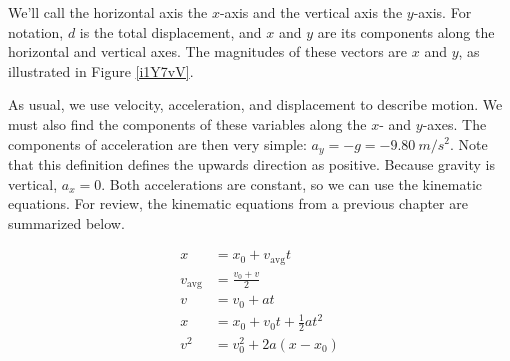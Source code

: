 \documentclass[main.tex]{subfiles}
\begin{document}
\vspace{1em}

We'll call the horizontal axis the $x$-axis and the vertical axis the $y$-axis. For notation, $d$ is the total displacement, and $x$ and $y$ are its components along the horizontal and vertical axes. The magnitudes of these vectors are $x$ and $y$, as illustrated in Figure \ref{i1Y7vV}.

\begin{center}
    \captionsetup{type=figure,margin=1in,font=scriptsize}
    \label{i1Y7vV}
\end{center}

\vspace{1em}

As usual, we use velocity, acceleration, and displacement to describe motion. We must also find the components of these variables along the $x$- and $y$-axes. The components of acceleration are then very simple: $a_y = -g = -\SI{9.80}{m/s^2}$. Note that this definition defines the upwards direction as positive. Because gravity is vertical, $a_x = 0$. Both accelerations are constant, so we can use the kinematic equations. For review, the kinematic equations from a previous chapter are summarized below.

\begin{align}
    x &= x_0 + v_{\text{avg}} t\\[0.5ex]
    v_{\text{avg}} &= \frac{v_0 + v}{2}\\[0.5ex]
    v &= v_0 + a t\\[0.5ex]
    x &= x_0 + v_0 t + \frac{1}{2} a t^2\\[0.5ex]
    v^2 &= v_0^2 + 2 a (x - x_0)
\end{align}
\end{document}
